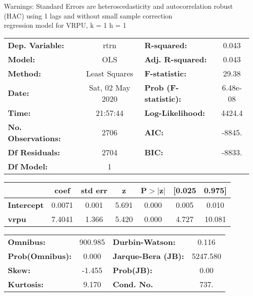 Warnings: \newline
 [1] Standard Errors are heteroscedasticity and autocorrelation robust (HAC) using 1 lags and without small sample correction\\ 

regression model for VRPU, k = 1 h = 1\begin{center}
\begin{tabular}{lclc}
\toprule
\textbf{Dep. Variable:}    &       rtrn       & \textbf{  R-squared:         } &     0.043   \\
\textbf{Model:}            &       OLS        & \textbf{  Adj. R-squared:    } &     0.043   \\
\textbf{Method:}           &  Least Squares   & \textbf{  F-statistic:       } &     29.38   \\
\textbf{Date:}             & Sat, 02 May 2020 & \textbf{  Prob (F-statistic):} &  6.48e-08   \\
\textbf{Time:}             &     21:57:44     & \textbf{  Log-Likelihood:    } &    4424.4   \\
\textbf{No. Observations:} &        2706      & \textbf{  AIC:               } &    -8845.   \\
\textbf{Df Residuals:}     &        2704      & \textbf{  BIC:               } &    -8833.   \\
\textbf{Df Model:}         &           1      & \textbf{                     } &             \\
\bottomrule
\end{tabular}
\begin{tabular}{lcccccc}
                   & \textbf{coef} & \textbf{std err} & \textbf{z} & \textbf{P$> |$z$|$} & \textbf{[0.025} & \textbf{0.975]}  \\
\midrule
\textbf{Intercept} &       0.0071  &        0.001     &     5.691  &         0.000        &        0.005    &        0.010     \\
\textbf{vrpu}      &       7.4041  &        1.366     &     5.420  &         0.000        &        4.727    &       10.081     \\
\bottomrule
\end{tabular}
\begin{tabular}{lclc}
\textbf{Omnibus:}       & 900.985 & \textbf{  Durbin-Watson:     } &    0.116  \\
\textbf{Prob(Omnibus):} &   0.000 & \textbf{  Jarque-Bera (JB):  } & 5247.580  \\
\textbf{Skew:}          &  -1.455 & \textbf{  Prob(JB):          } &     0.00  \\
\textbf{Kurtosis:}      &   9.170 & \textbf{  Cond. No.          } &     737.  \\
\bottomrule
\end{tabular}
\end{center}

